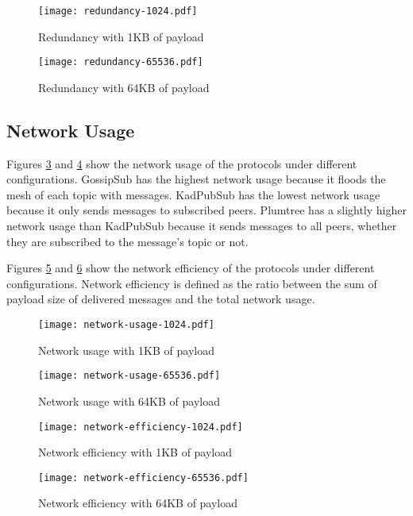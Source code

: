 \documentclass[sigconf]{acmart}
\begin{document}
\begin{figure}[htp]
    \centering
    \texttt{[image: redundancy-1024.pdf]}
    \caption{Redundancy with 1KB of payload}
    \label{fig:redundancy-1024}
\end{figure}

\begin{figure}[htp]
    \centering
    \texttt{[image: redundancy-65536.pdf]}
    \caption{Redundancy with 64KB of payload}
    \label{fig:redundancy-65536}
\end{figure}

\subsection{Network Usage}
Figures \ref{fig:network-usage-1024} and \ref{fig:network-usage-65536} show the network usage of the protocols under different configurations. GossipSub has the highest network usage because it floods the mesh of each topic with messages. KadPubSub has the lowest network usage because it only sends messages to subscribed peers. Plumtree has a slightly higher network usage than KadPubSub because it sends messages to all peers, whether they are subscribed to the message's topic or not.

Figures \ref{fig:network-efficiency-1024} and \ref{fig:network-efficiency-65536} show the network efficiency of the protocols under different configurations.
Network efficiency is defined as the ratio between the sum of payload size of delivered messages and the total network usage.

\begin{figure}[htp]
    \centering
    \texttt{[image: network-usage-1024.pdf]}
    \caption{Network usage with 1KB of payload}
    \label{fig:network-usage-1024}
\end{figure}

\begin{figure}[htp]
    \centering
    \texttt{[image: network-usage-65536.pdf]}
    \caption{Network usage with 64KB of payload}
    \label{fig:network-usage-65536}
\end{figure}

\begin{figure}[htp]
    \centering
    \texttt{[image: network-efficiency-1024.pdf]}
    \caption{Network efficiency with 1KB of payload}
    \label{fig:network-efficiency-1024}
\end{figure}

\begin{figure}[htp]
    \centering
    \texttt{[image: network-efficiency-65536.pdf]}
    \caption{Network efficiency with 64KB of payload}
    \label{fig:network-efficiency-65536}
\end{figure}
\end{document}
